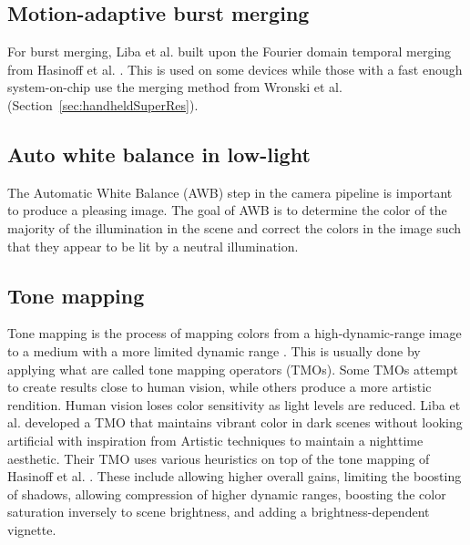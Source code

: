 \documentclass{sig-alternate}
\begin{document}
\subsection{Motion-adaptive burst merging}
\label{sec:motionBurstMerging}

For burst merging, Liba et al. built upon the Fourier domain temporal merging from Hasinoff et al. \cite{Hasinoff2016}. This is used on some devices while those with a fast enough system-on-chip use the merging method from Wronski et al. (Section~\ref{sec:handheldSuperRes}).


\subsection{Auto white balance in low-light}
\label{sec:autoWhiteBal}

The Automatic White Balance (AWB) step in the camera pipeline is important to produce a pleasing image. The goal of AWB is to determine the color of the majority of the illumination in the scene and correct the colors in the image such that they appear to be lit by a neutral illumination. 



\subsection{Tone mapping}
\label{sec:toneMapping}

Tone mapping is the process of mapping colors from a high-dynamic-range image to a medium with a more limited dynamic range \cite{wiki:ToneMapping}. This is usually done by applying what are called tone mapping operators (TMOs). Some TMOs attempt to create results close to human vision, while others produce a more artistic rendition. Human vision loses color sensitivity as light levels are reduced. Liba et al. developed a TMO that maintains vibrant color in dark scenes without looking artificial with inspiration from Artistic techniques to maintain a nighttime aesthetic. Their TMO uses various heuristics on top of the tone mapping of Hasinoff et al. \cite{Hasinoff2016}. These include allowing higher overall gains, limiting the boosting of shadows, allowing compression of higher dynamic ranges, boosting the color saturation inversely to scene brightness, and adding a brightness-dependent vignette. \cite{Liba2019}
\end{document}
